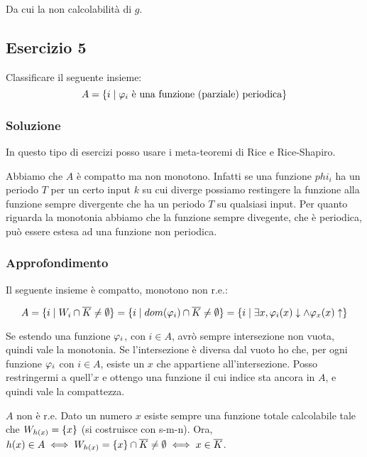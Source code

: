 Da cui la non calcolabilità di $g$.

\subsection{Esercizio 5}

Classificare il seguente insieme:
\begin{equation*}
    A = \{i \mid \text{$\varphi_{i}$ è una funzione (parziale) periodica}\}
\end{equation*}

\subsubsection{Soluzione}

In questo tipo di esercizi posso usare i meta-teoremi di Rice e Rice-Shapiro.

Abbiamo che $A$ è compatto ma non monotono. Infatti se una funzione $phi_{i}$ ha un periodo $T$ per
un certo input $k$ su cui diverge possiamo restingere la funzione alla funzione sempre divergente
che ha un periodo $T$ su qualsiasi input. Per quanto riguarda la monotonia abbiamo che la funzione
sempre divegente, che è periodica, può essere estesa ad una funzione non periodica.

\subsubsection{Approfondimento}

Il seguente insieme è compatto, monotono non r.e.:

\begin{equation*}
    A = \{ i \mid W_{i} \cap \overline{K} \not= \emptyset\} = \{ i \mid dom(\varphi_{i}) \cap \overline{K}
    \not= \emptyset \} = \{ i \mid \exists x, \varphi_{i}(x) \downarrow \land \varphi_{x}(x) \uparrow\}
\end{equation*}

Se estendo una funzione $\varphi_{i}$, con $i \in A$, avrò sempre intersezione non vuota, quindi vale la
monotonia. Se l'intersezione è diversa dal vuoto ho che, per ogni funzione $\varphi_{i}$ con $i \in A$,
esiste un $x$ che appartiene all'intersezione. Posso restringermi a quell'$x$ e ottengo una funzione
il cui indice sta ancora in $A$, e quindi vale la compattezza.

$A$ non è r.e. Dato un numero $x$ esiste sempre una funzione totale calcolabile tale che $W_{h(x)}
= \{x\}$ (si costruisce con s-m-n). Ora, $h(x) \in A \iff W_{h(x)} = \{x\} \cap \overline{K} \not=
\emptyset \iff x \in \overline{K}$.

